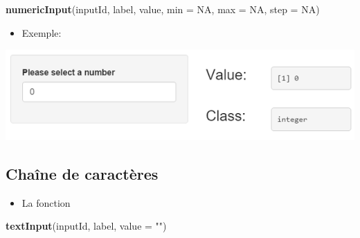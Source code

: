 \documentclass[]{article}
\newenvironment{Shaded}{\begin{snugshade}}{\end{snugshade}}
\newcommand{\KeywordTok}[1]{\textcolor[rgb]{0.13,0.29,0.53}{\textbf{#1}}}
\newcommand{\DataTypeTok}[1]{\textcolor[rgb]{0.13,0.29,0.53}{#1}}
\newcommand{\DecValTok}[1]{\textcolor[rgb]{0.00,0.00,0.81}{#1}}
\newcommand{\StringTok}[1]{\textcolor[rgb]{0.31,0.60,0.02}{#1}}
\newcommand{\CommentTok}[1]{\textcolor[rgb]{0.56,0.35,0.01}{\textit{#1}}}
\newcommand{\OtherTok}[1]{\textcolor[rgb]{0.56,0.35,0.01}{#1}}
\newcommand{\NormalTok}[1]{#1}
\providecommand{\tightlist}{%
  \setlength{\itemsep}{0pt}\setlength{\parskip}{0pt}}
\begin{document}
\begin{Shaded}
\begin{Highlighting}[]
\KeywordTok{numericInput}\NormalTok{(inputId, label, value, }\DataTypeTok{min =} \OtherTok{NA}\NormalTok{, }\DataTypeTok{max =} \OtherTok{NA}\NormalTok{, }\DataTypeTok{step =} \OtherTok{NA}\NormalTok{)}
\end{Highlighting}
\end{Shaded}

\begin{itemize}
\tightlist
\item
  Exemple:
\end{itemize}

\begin{Shaded}
\end{Shaded}

\includegraphics{img/numeric.png}

\subsection{Chaîne de caractères}\label{chaine-de-caracteres}

\begin{itemize}
\tightlist
\item
  La fonction
\end{itemize}

\begin{Shaded}
\begin{Highlighting}[]
\KeywordTok{textInput}\NormalTok{(inputId, label, }\DataTypeTok{value =} \StringTok{""}\NormalTok{)}
\end{Highlighting}
\end{Shaded}
\end{document}
